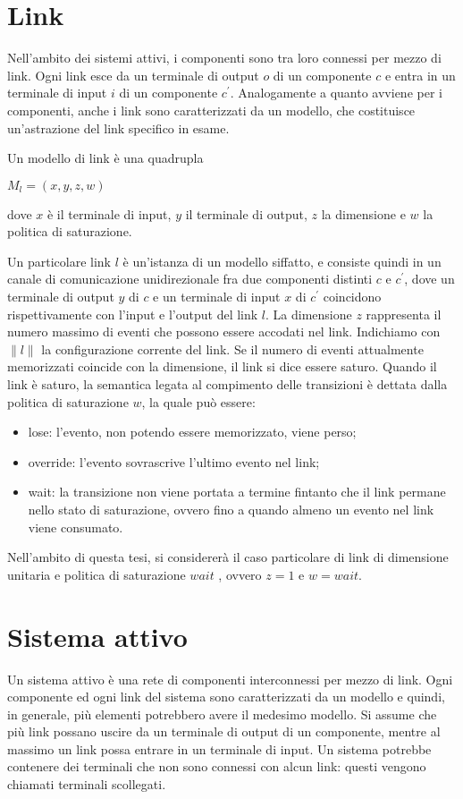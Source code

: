 \section{Link}
Nell'ambito dei sistemi attivi, i componenti sono tra loro connessi per mezzo di link. Ogni link esce da un terminale di output $o$ di un componente $c$ e entra in un terminale di input $i$ di un componente $c^\prime$.
Analogamente a quanto avviene per i componenti, anche i link sono caratterizzati da un modello, che costituisce un'astrazione del link specifico in esame.

\begin{defn}
Un modello di link è una quadrupla
\begin{center}
	$M_l = (x,y,z,w)$
\end{center}
dove $x$ è il terminale di input, $y$ il terminale di output, $z$ la dimensione e $w$ la politica di saturazione.
\end{defn}
Un particolare link $l$ è un'istanza di un modello siffatto, e consiste quindi in un canale di comunicazione unidirezionale fra due componenti distinti $c$ e $c^\prime$, dove un terminale di output $y$ di $c$ e un terminale di input $x$ di $c^\prime$ coincidono rispettivamente con l'input e l'output del link $l$.
La dimensione $z$ rappresenta il numero massimo di eventi che possono essere accodati nel link. 
Indichiamo con $\parallel l \parallel$ la configurazione corrente del link. 
Se il numero di eventi attualmente memorizzati coincide con la dimensione, il link si dice essere saturo.
Quando il link è saturo, la semantica legata al compimento delle transizioni è dettata dalla politica di saturazione $w$, la quale può essere:
\begin{itemize}
\item lose: l'evento, non potendo essere memorizzato, viene perso;
\item override: l'evento sovrascrive l'ultimo evento nel link;
\item wait: la transizione non viene portata a termine fintanto che il link permane nello stato di saturazione, ovvero fino a quando almeno un evento nel link viene consumato.
\end{itemize}
Nell'ambito di questa tesi, si considererà il caso particolare di link di dimensione unitaria e politica di saturazione $wait$ , ovvero $z = 1$ e $w = wait$.

\section{Sistema attivo}
Un sistema attivo è una rete di componenti interconnessi per mezzo di link. Ogni componente ed ogni link del sistema sono caratterizzati da un modello e quindi, in generale, più elementi potrebbero avere il medesimo modello. Si assume che più link possano uscire da un terminale di output di un componente, mentre al massimo un link possa entrare in un terminale di input.
Un sistema potrebbe contenere dei terminali che non sono connessi con alcun link: questi vengono chiamati terminali scollegati.

